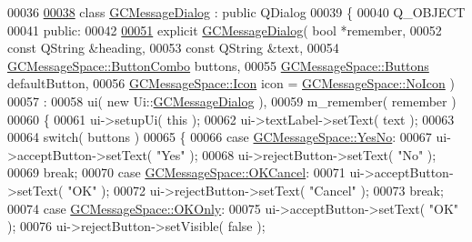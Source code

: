 \begin{DoxyCode}
00036 
\hypertarget{gcmessagespace_8cpp_source_l00038}{}\hyperlink{class_g_c_message_dialog}{00038} \textcolor{keyword}{class }\hyperlink{class_g_c_message_dialog}{GCMessageDialog} : \textcolor{keyword}{public} QDialog
00039 \{
00040   Q\_OBJECT
00041 \textcolor{keyword}{public}:
00042 
\hypertarget{gcmessagespace_8cpp_source_l00051}{}\hyperlink{class_g_c_message_dialog_ad2f8910da38a44831096a9c7f1e08323}{00051}   \textcolor{keyword}{explicit} \hyperlink{class_g_c_message_dialog_ad2f8910da38a44831096a9c7f1e08323}{GCMessageDialog}( \textcolor{keywordtype}{bool} *remember,
00052                             \textcolor{keyword}{const} QString &heading,
00053                             \textcolor{keyword}{const} QString &text,
00054                             \hyperlink{namespace_g_c_message_space_ac1db082c29062fe6508ba03bf76bea44}{GCMessageSpace::ButtonCombo} buttons,
00055                             \hyperlink{namespace_g_c_message_space_a631906a7d53f30328cf2249a00078b5b}{GCMessageSpace::Buttons} defaultButton,
00056                             \hyperlink{namespace_g_c_message_space_a67e94586e09cbc305257fbcdd7b686e2}{GCMessageSpace::Icon} icon = \hyperlink{namespace_g_c_message_space_a67e94586e09cbc305257fbcdd7b686e2a54bba077357d6db019fb791266e133f0}{GCMessageSpace::NoIcon} 
      )
00057     :
00058       ui( new Ui::\hyperlink{class_g_c_message_dialog}{GCMessageDialog} ),
00059       m\_remember( remember )
00060   \{
00061     ui->setupUi( \textcolor{keyword}{this} );
00062     ui->textLabel->setText( text );
00063 
00064     \textcolor{keywordflow}{switch}( buttons )
00065     \{
00066     \textcolor{keywordflow}{case} \hyperlink{namespace_g_c_message_space_ac1db082c29062fe6508ba03bf76bea44ab2defe87f3e886edf34f537f4ac8c282}{GCMessageSpace::YesNo}:
00067       ui->acceptButton->setText( \textcolor{stringliteral}{"Yes"} );
00068       ui->rejectButton->setText( \textcolor{stringliteral}{"No"} );
00069       \textcolor{keywordflow}{break};
00070     \textcolor{keywordflow}{case} \hyperlink{namespace_g_c_message_space_ac1db082c29062fe6508ba03bf76bea44a7de67bd6b388b96a468fcf8246dfdece}{GCMessageSpace::OKCancel}:
00071       ui->acceptButton->setText( \textcolor{stringliteral}{"OK"} );
00072       ui->rejectButton->setText( \textcolor{stringliteral}{"Cancel"} );
00073       \textcolor{keywordflow}{break};
00074     \textcolor{keywordflow}{case} \hyperlink{namespace_g_c_message_space_ac1db082c29062fe6508ba03bf76bea44a3baa10aa8947d81b9001802c55131570}{GCMessageSpace::OKOnly}:
00075       ui->acceptButton->setText( \textcolor{stringliteral}{"OK"} );
00076       ui->rejectButton->setVisible( \textcolor{keyword}{false} );

\end{DoxyCode}
